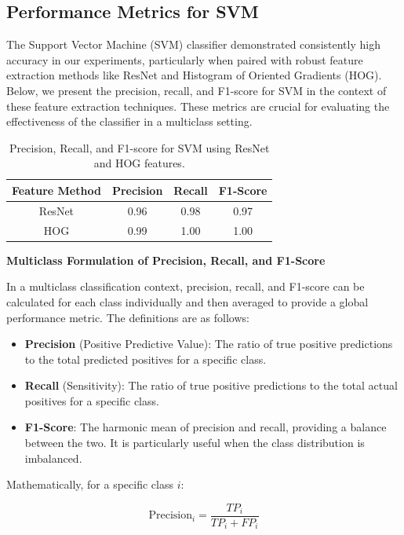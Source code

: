 \documentclass[a4paper]{article}
\theoremstyle{plain}
\theoremstyle{definition}
\begin{document}
\subsection{Performance Metrics for SVM}

The Support Vector Machine (SVM) classifier demonstrated consistently high accuracy in our experiments, particularly when paired with robust feature extraction methods like ResNet and Histogram of Oriented Gradients (HOG). Below, we present the precision, recall, and F1-score for SVM in the context of these feature extraction techniques. These metrics are crucial for evaluating the effectiveness of the classifier in a multiclass setting.

\begin{table}[h]
\centering
\begin{tabular}{|c|c|c|c|}
\hline
\textbf{Feature Method} & \textbf{Precision} & \textbf{Recall} & \textbf{F1-Score} \\
\hline
ResNet & 0.96 & 0.98 & 0.97 \\
\hline
HOG & 0.99 & 1.00 & 1.00 \\
\hline
\end{tabular}
\caption{Precision, Recall, and F1-score for SVM using ResNet and HOG features.}
\label{tab:svm_metrics}
\end{table}

\textbf{Multiclass Formulation of Precision, Recall, and F1-Score}

In a multiclass classification context, precision, recall, and F1-score can be calculated for each class individually and then averaged to provide a global performance metric. The definitions are as follows:

\begin{itemize}
    \item \textbf{Precision} (Positive Predictive Value): The ratio of true positive predictions to the total predicted positives for a specific class.
    \item \textbf{Recall} (Sensitivity): The ratio of true positive predictions to the total actual positives for a specific class.
    \item \textbf{F1-Score}: The harmonic mean of precision and recall, providing a balance between the two. It is particularly useful when the class distribution is imbalanced.
\end{itemize}

Mathematically, for a specific class \( i \):

\begin{equation}
    \text{Precision}_i = \frac{TP_i}{TP_i + FP_i}
\end{equation}
\end{document}
